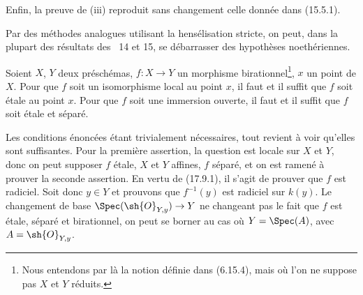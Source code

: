 Enfin, la preuve de (iii) reproduit sans changement celle donnée dans (15.5.1).

\begin{env}[18.10.17.2]
\label{IV.18.10.17.2}
Par des méthodes analogues utilisant la hensélisation stricte, on peut, dans la plupart des résultats des \textsection\textsection~14 et 15, se débarrasser des hypothèses noethériennes.
\end{env}

\begin{lemma}[18.10.18]
\label{IV.18.10.18}
Soient $X$, $Y$ deux préschémas, $f:X\to Y$ un morphisme birationnel\footnote{Nous entendons par là la notion définie dans (6.15.4), mais où l'on ne suppose pas $X$ et $Y$ réduits.}, $x$ un point de $X$. Pour que $f$ soit un isomorphisme local au point $x$, il faut et il suffit que $f$ soit étale au point $x$. Pour que $f$ soit une immersion ouverte, il faut et il suffit que $f$ soit étale et séparé.
\end{lemma}

Les conditions énoncées étant trivialement nécessaires, tout revient à voir qu'elles sont suffisantes. Pour la première assertion, la question est locale sur $X$ et $Y$, donc on peut supposer $f$ étale, $X$ et $Y$ affines, $f$ séparé, et on est ramené à prouver la seconde assertion. En vertu de (17.9.1), il s'agit de prouver que $f$ est radiciel. Soit donc $y\in Y$ et prouvons que $f^{-1}(y)$ est radiciel sur $k(y)$. Le changement de base $\Spec(\sh{O}_{Y,y})\to Y$ ne changeant pas le fait que $f$ est étale, séparé et birationnel, on peut se borner au cas où $Y=\Spec(A)$, avec $A=\sh{O}_{Y,y}$.


